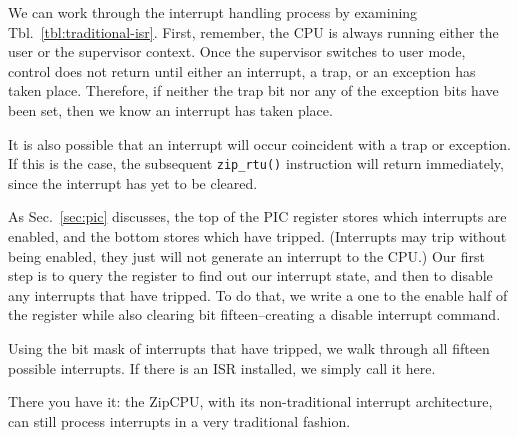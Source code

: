 \documentclass{gqtekspec}
\begin{document}
We can work through the interrupt handling process by examining
Tbl.~\ref{tbl:traditional-isr}.  First, remember, the CPU is always running
either the user or the supervisor context.  Once the supervisor switches to
user mode, control does not return until either an interrupt, a trap, or an
exception has taken place.  Therefore, if neither the trap bit nor any of the
exception bits have been set, then we know an interrupt has taken place.

It is also possible that an interrupt will occur coincident with a trap or
exception.  If this is the case, the subsequent {\tt zip\_rtu()} instruction
will return immediately, since the interrupt has yet to be cleared.

As Sec.~\ref{sec:pic} discusses, the top of the PIC register stores which 
interrupts are enabled, and the bottom stores which have tripped.  (Interrupts
may trip without being enabled, they just will not generate an interrupt to the
CPU.)  Our first step is to query the register to find out our interrupt
state, and then to disable any interrupts that have tripped.  To do
that, we write a one to the enable half of the register while also clearing
bit fifteen--creating a disable interrupt command.

Using the bit mask of interrupts that have tripped, we walk through all fifteen
possible interrupts.  If there is an ISR installed, we simply call it here.

There you have it: the ZipCPU, with its non-traditional interrupt architecture,
can still process interrupts in a very traditional fashion. 
\end{document}
